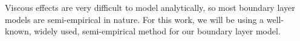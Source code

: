Viscous effects are very difficult to model analytically, so most boundary layer models are semi-empirical in nature.
For this work, we will be using a well-known, widely used, semi-empirical method for our boundary layer model.









